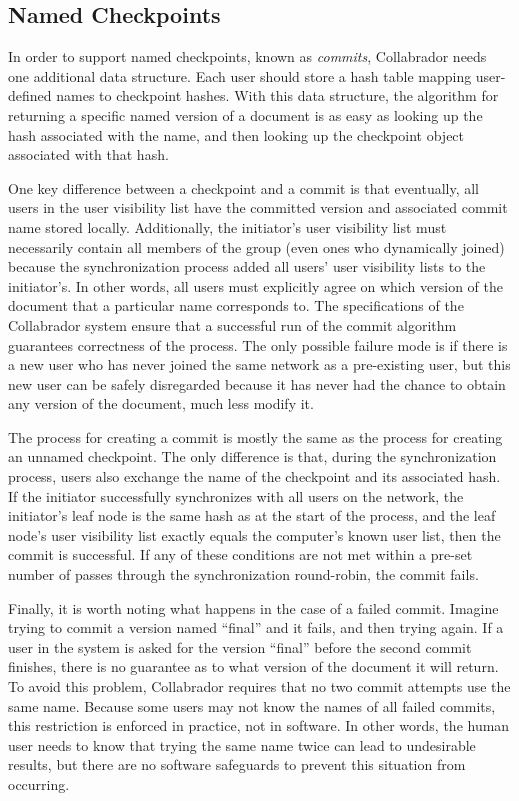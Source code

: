 \documentclass[11pt,titlepage]{article}
\begin{document}
\subsection{Named Checkpoints}

In order to support named checkpoints, known as \emph{commits},
Collabrador needs one additional data structure. Each user should
store a hash table mapping user-defined names to checkpoint hashes. 
With this data structure, the algorithm for returning a specific named
version of a document is as easy as looking up the hash associated with the name,
and then looking up the checkpoint object associated with that hash.

One key difference between a checkpoint and a commit is that eventually, 
all users in the user visibility list have the
committed version and associated commit name stored
locally. Additionally, the initiator's user visibility list must
necessarily contain all members of the group (even ones who
dynamically joined) because the synchronization process added all
users' user visibility lists to the initiator's. In other words,
all users must explicitly agree on which version of the document that
a particular name corresponds to. 
The specifications of the Collabrador system ensure that a successful
run of the commit algorithm guarantees correctness of the
process. The only possible failure mode is if there is a new user
 who has never joined the same network as a pre-existing user, 
but this new user can be safely disregarded because it has never 
had the chance to obtain any version of the document, much less modify it.

The process for creating a commit is mostly the same as the process
for creating an unnamed checkpoint. The only difference is that,
during the synchronization process, users also exchange the name of
the checkpoint and its associated hash. If the initiator successfully
synchronizes with all users on the network, the initiator's leaf node
is the same hash as at the start of the process, and the leaf node's
user visibility list exactly equals the computer's known user list,
then the commit is successful. If any of these conditions are not met
within a pre-set number of passes through the synchronization
round-robin, the commit fails.

Finally, it is worth noting what happens in the case of a failed
commit. Imagine trying to commit a version named ``final'' and it
fails, and then trying again. If a user in the system is asked for the
version ``final'' before the second commit finishes, there is no
guarantee as to what version of the document it will return. To avoid
this problem, Collabrador requires that no two commit attempts use the
same name. Because some users may not know the names of all failed
commits, this restriction is enforced in practice, not in software. In
other words, the human user needs to know that trying the same name
twice can lead to undesirable results, but there are no software
safeguards to prevent this situation from occurring.
\end{document}
